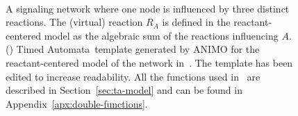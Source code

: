 \documentclass{llncs}
\newcommand{\tas}{Timed Automata}
\begin{document}
\begin{figure}[thb]
  \begin{center}
   \qquad\quad
   \\
  \end{center}\vspace{-.5cm}
  \caption{\scriptsize 
{\bf\protect{}} A signaling network where one node is influenced by three distinct reactions.
The (virtual) reaction $R_A$ is defined in
the reactant-centered model as the algebraic sum of the reactions influencing $A$.
({\bf\protect{}}) \tas\ template generated by ANIMO for the reactant-centered
 model of the network in~{\bf\protect{}}. The template has been edited to increase readability.
All the functions used in~{\bf\protect{}} are described in
Section~\ref{sec:ta-model} and can be found in Appendix~\ref{apx:double-functions}.
\label{fig:ta-models}}
\vspace{-1mm}
\end{figure}
\end{document}
